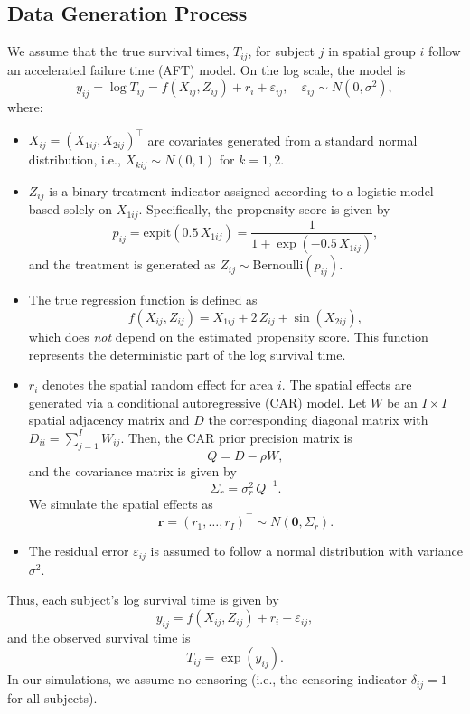 \documentclass[useAMS,referee]{biom}
\begin{document}
\subsection{Data Generation Process}

We assume that the true survival times, \(T_{ij}\), for subject \(j\) in spatial group \(i\) follow an accelerated failure time (AFT) model. On the log scale, the model is
\begin{equation} \label{eq:logT}
y_{ij} = \log T_{ij} = f(X_{ij}, Z_{ij}) + r_i + \varepsilon_{ij}, \quad \varepsilon_{ij} \sim N(0,\sigma^2),
\end{equation}
where:
\begin{itemize}
    \item \(X_{ij} = (X_{1ij}, X_{2ij})^\top\) are covariates generated from a standard normal distribution, i.e., \(X_{kij} \sim N(0,1)\) for \(k=1,2\).
    \item \(Z_{ij}\) is a binary treatment indicator assigned according to a logistic model based solely on \(X_{1ij}\). Specifically, the propensity score is given by
    \[
    p_{ij} = \text{expit}(0.5\,X_{1ij}) = \frac{1}{1 + \exp(-0.5\,X_{1ij})},
    \]
    and the treatment is generated as \(Z_{ij} \sim \text{Bernoulli}(p_{ij})\).
    \item The true regression function is defined as
    \[
    f(X_{ij}, Z_{ij}) = X_{1ij} + 2\,Z_{ij} + \sin(X_{2ij}),
    \]
    which does \emph{not} depend on the estimated propensity score. This function represents the deterministic part of the log survival time.
    \item \(r_i\) denotes the spatial random effect for area \(i\). The spatial effects are generated via a conditional autoregressive (CAR) model. Let \(W\) be an \(I\times I\) spatial adjacency matrix and \(D\) the corresponding diagonal matrix with \(D_{ii} = \sum_{j=1}^{I} W_{ij}\). Then, the CAR prior precision matrix is
    \[
    Q = D - \rho W,
    \]
    and the covariance matrix is given by
    \[
    \Sigma_r = \sigma_r^2\, Q^{-1}.
    \]
    We simulate the spatial effects as
    \[
    \mathbf{r} = (r_1, \dots, r_I)^\top \sim N(\mathbf{0}, \Sigma_r).
    \]
    \item The residual error \(\varepsilon_{ij}\) is assumed to follow a normal distribution with variance \(\sigma^2\).
\end{itemize}

Thus, each subject's log survival time is given by
\[
y_{ij} = f(X_{ij}, Z_{ij}) + r_i + \varepsilon_{ij},
\]
and the observed survival time is
\[
T_{ij} = \exp(y_{ij}).
\]
In our simulations, we assume no censoring (i.e., the censoring indicator \(\delta_{ij} = 1\) for all subjects).
\end{document}
